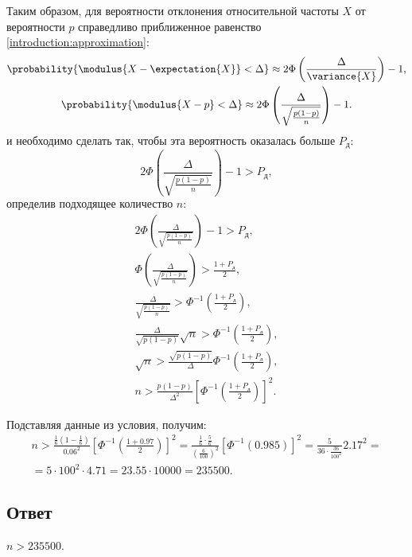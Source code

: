 Таким образом, для вероятности отклонения относительной частоты $X$ от вероятности $p$ справедливо приближенное равенство \eqref{introduction:approximation}:
\begin{gather}
    \probability{\modulus{X - \expectation{X}} < \Delta} \approx 2 \Phi \left ( \frac{\Delta}{\variance{X}} \right ) - 1 , \\
    \probability{\modulus{X - p} < \Delta} \approx 2 \Phi \left ( \frac{\Delta}{\sqrt{\frac{p(1-p)}{n}}} \right ) - 1 .
\end{gather}
и необходимо сделать так, чтобы эта вероятность оказалась больше $P_\text{д}$:
\begin{equation}
    2 \Phi \left ( \frac{\Delta}{\sqrt{\frac{p(1-p)}{n}}} \right ) - 1 > P_\text{д} ,
\end{equation}
определив подходящее количество $n$:
\begin{gather}
    2 \Phi \left ( \frac{\Delta}{\sqrt{\frac{p(1-p)}{n}}} \right ) - 1 > P_\text{д} , \\
    \Phi \left ( \frac{\Delta}{\sqrt{\frac{p(1-p)}{n}}} \right ) > \frac{1 + P_\text{д}}{2} , \\
    \frac{\Delta}{\sqrt{\frac{p(1-p)}{n}}} > \Phi^{-1} \left ( \frac{1 + P_\text{д}}{2} \right ) , \\
    \frac{\Delta}{\sqrt{p(1-p)}} \sqrt{n} > \Phi^{-1} \left ( \frac{1 + P_\text{д}}{2} \right ) , \\
    \sqrt{n} > \frac{\sqrt{p(1-p)}}{\Delta} \Phi^{-1} \left ( \frac{1 + P_\text{д}}{2} \right ) , \\
    n > \frac{p(1-p)}{\Delta^2} \left [ \Phi^{-1} \left ( \frac{1 + P_\text{д}}{2} \right ) \right ]^2 .
\end{gather}

Подставляя данные из условия, получим:
\begin{multline}
    n >
    \frac{\frac{1}{6} \left ( 1 - \frac{1}{6} \right )}{0.06^2} \left [ \Phi^{-1} \left ( \frac{1 + 0.97}{2} \right ) \right ]^2
    = \frac{\frac{1}{6} \cdot \frac{5}{6}}{\left ( \frac{6}{100} \right )^2} \left [ \Phi^{-1} \left ( 0.985 \right ) \right ]^2
    = \frac{5}{36 \cdot \frac{36}{100^2}} 2.17^2 = \\
    = 5 \cdot 100^2 \cdot 4.71
    = 23.55 \cdot 10000
    = 235500 .
\end{multline}
\subsection*{Ответ}
$n > 235500$.


